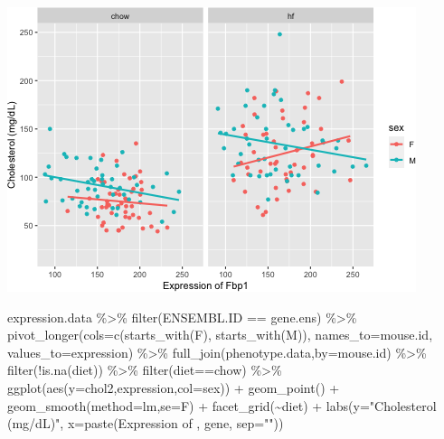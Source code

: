 \documentclass[
]{article}
\newenvironment{Shaded}{\begin{snugshade}}{\end{snugshade}}
\newcommand{\AttributeTok}[1]{\textcolor[rgb]{0.77,0.63,0.00}{#1}}
\newcommand{\FunctionTok}[1]{\textcolor[rgb]{0.00,0.00,0.00}{#1}}
\newcommand{\NormalTok}[1]{#1}
\newcommand{\SpecialCharTok}[1]{\textcolor[rgb]{0.00,0.00,0.00}{#1}}
\newcommand{\StringTok}[1]{\textcolor[rgb]{0.31,0.60,0.02}{#1}}
\begin{document}
\includegraphics{figures/Fbp1-associations-1.png}

\begin{Shaded}
\begin{Highlighting}[]
\NormalTok{expression.data }\SpecialCharTok{\%\textgreater{}\%}
  \FunctionTok{filter}\NormalTok{(ENSEMBL.ID }\SpecialCharTok{==}\NormalTok{ gene.ens) }\SpecialCharTok{\%\textgreater{}\%}
  \FunctionTok{pivot\_longer}\NormalTok{(}\AttributeTok{cols=}\FunctionTok{c}\NormalTok{(}\FunctionTok{starts\_with}\NormalTok{(}\StringTok{\textquotesingle{}F\textquotesingle{}}\NormalTok{),}
                      \FunctionTok{starts\_with}\NormalTok{(}\StringTok{\textquotesingle{}M\textquotesingle{}}\NormalTok{)),}
               \AttributeTok{names\_to=}\StringTok{\textquotesingle{}mouse.id\textquotesingle{}}\NormalTok{,}
               \AttributeTok{values\_to=}\StringTok{\textquotesingle{}expression\textquotesingle{}}\NormalTok{) }\SpecialCharTok{\%\textgreater{}\%}
  \FunctionTok{full\_join}\NormalTok{(phenotype.data,}\AttributeTok{by=}\StringTok{\textquotesingle{}mouse.id\textquotesingle{}}\NormalTok{) }\SpecialCharTok{\%\textgreater{}\%}
  \FunctionTok{filter}\NormalTok{(}\SpecialCharTok{!}\FunctionTok{is.na}\NormalTok{(diet)) }\SpecialCharTok{\%\textgreater{}\%}
  \FunctionTok{filter}\NormalTok{(diet}\SpecialCharTok{==}\StringTok{\textquotesingle{}chow\textquotesingle{}}\NormalTok{) }\SpecialCharTok{\%\textgreater{}\%}
  \FunctionTok{ggplot}\NormalTok{(}\FunctionTok{aes}\NormalTok{(}\AttributeTok{y=}\NormalTok{chol2,expression,}\AttributeTok{col=}\NormalTok{sex)) }\SpecialCharTok{+}
  \FunctionTok{geom\_point}\NormalTok{() }\SpecialCharTok{+}
  \FunctionTok{geom\_smooth}\NormalTok{(}\AttributeTok{method=}\StringTok{\textquotesingle{}lm\textquotesingle{}}\NormalTok{,}\AttributeTok{se=}\NormalTok{F) }\SpecialCharTok{+}
  \FunctionTok{facet\_grid}\NormalTok{(}\SpecialCharTok{\textasciitilde{}}\NormalTok{diet) }\SpecialCharTok{+}
  \FunctionTok{labs}\NormalTok{(}\AttributeTok{y=}\StringTok{"Cholesterol (mg/dL)"}\NormalTok{,}
       \AttributeTok{x=}\FunctionTok{paste}\NormalTok{(}\StringTok{\textquotesingle{}Expression of \textquotesingle{}}\NormalTok{, gene, }\AttributeTok{sep=}\StringTok{""}\NormalTok{))}
\end{Highlighting}
\end{Shaded}
\end{document}
